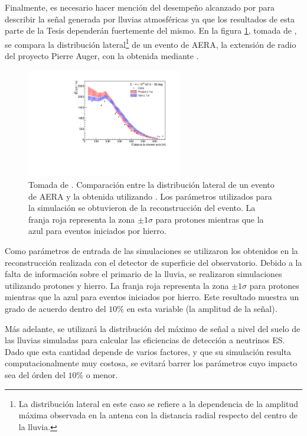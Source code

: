 		Finalmente, es necesario hacer menci\'on del desempe\~no alcanzado por \zhs{} para describir la se\~nal generada por lluvias atmosf\'ericas ya que los resultados de esta parte de la Tesis depender\'an fuertemente del mismo.
		En la figura \ref{fig:zhsvsdata}, tomada de \cite{cite:icrc13Auger}, se compara la distribuci\'on lateral\footnote{La distribuci\'on lateral en este caso se refiere a la dependencia de la amplitud m\'axima observada en la antena con la distancia radial respecto del centro de la lluvia.} de un evento de AERA, la extensi\'on de radio del proyecto Pierre Auger, con la obtenida mediante \zhs{}.
		\begin{figure}[ht!]
		\centering
			\includegraphics[width=0.6\textwidth]{fig/simulacionRadio/ZHAireS_and_data}
			\caption{\label{fig:zhsvsdata} Tomada de \cite{cite:icrc13Auger}. Comparaci\'on entre la distribuci\'on lateral de un evento de AERA y la obtenida utilizando \zhs{}. Los par\'ametros utilizados para la simulaci\'on se obtuvieron de la reconstrucci\'on del evento. La franja roja representa la zona $\pm1\sigma$ para protones mientras que la azul para eventos iniciados por hierro.}
		\end{figure}
		Como par\'ametros de entrada de las simulaciones se utilizaron los obtenidos en la reconstrucci\'on realizada con el detector de superficie del observatorio. 
		Debido a la falta de informaci\'on sobre el primario de la lluvia, se realizaron simulaciones utilizando protones y hierro. La franja roja representa la zona $\pm1\sigma$ para protones mientras que la azul para eventos iniciados por hierro.
		Este resultado muestra un grado de acuerdo dentro del $10\%$ en esta variable (la amplitud de la se\~nal).
		
		M\'as adelante, se utilizar\'a la distribuci\'on del m\'aximo de se\~nal a nivel del suelo de las lluvias simuladas para calcular las eficiencias de detecci\'on a neutrinos ES. 
		Dado que esta cantidad depende de varios factores, y que su simulaci\'on resulta computacionalmente muy costosa, se evitar\'a barrer los par\'ametros cuyo impacto sea del \'orden del $10\%$ o menor.
		
